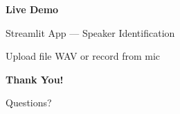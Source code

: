 \documentclass[aspectratio=169]{beamer}
\begin{document}
\begin{frame}
\begin{center}
\Huge \textbf{Live Demo}

\vspace{0.5cm}
\large Streamlit App — Speaker Identification

\vspace{0.3cm}
\normalsize Upload file WAV or record from mic
\end{center}
\end{frame}

\begin{frame}
\begin{center}
\Huge \textbf{Thank You!}

\vspace{0.5cm}
\large Questions?
\end{center}
\end{frame}
\end{document}
